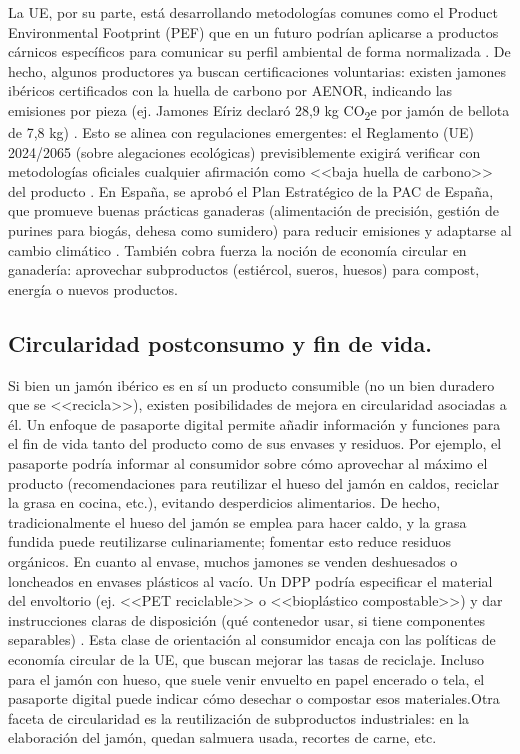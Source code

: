 La UE, por su parte, está desarrollando metodologías comunes como el Product Environmental Footprint (PEF) que en un futuro podrían aplicarse a productos cárnicos específicos para comunicar su perfil ambiental de forma normalizada \cite{noauthor_product_nodate}. De hecho, algunos productores ya buscan certificaciones voluntarias: existen jamones ibéricos certificados con la huella de carbono por AENOR, indicando las emisiones por pieza (ej. Jamones Eíriz declaró 28,9 kg CO\textsubscript{2}e por jamón de bellota de 7,8 kg) \cite{burgues_jamones_2015}. Esto se alinea con regulaciones emergentes: el Reglamento (UE) 2024/2065 (sobre alegaciones ecológicas) previsiblemente exigirá verificar con metodologías oficiales cualquier afirmación como <<baja huella de carbono>> del producto \cite{noauthor_directiva_nodate}. En España, se aprobó el Plan Estratégico de la PAC de España, que promueve buenas prácticas ganaderas (alimentación de precisión, gestión de purines para biogás, dehesa como sumidero) para reducir emisiones y adaptarse al cambio climático \cite{noauthor_plan_nodate}. También cobra fuerza la noción de economía circular en ganadería: aprovechar subproductos (estiércol, sueros, huesos) para compost, energía o nuevos productos.

\subsection{Circularidad postconsumo y fin de vida.}
Si bien un jamón ibérico es en sí un producto consumible (no un bien duradero que se <<recicla>>), existen posibilidades de mejora en circularidad asociadas a él. Un enfoque de pasaporte digital permite añadir información y funciones para el fin de vida tanto del producto como de sus envases y residuos. Por ejemplo, el pasaporte podría informar al consumidor sobre cómo aprovechar al máximo el producto (recomendaciones para reutilizar el hueso del jamón en caldos, reciclar la grasa en cocina, etc.), evitando desperdicios alimentarios. De hecho, tradicionalmente el hueso del jamón se emplea para hacer caldo, y la grasa fundida puede reutilizarse culinariamente; fomentar esto reduce residuos orgánicos. En cuanto al envase, muchos jamones se venden deshuesados o loncheados en envases plásticos al vacío. Un DPP podría especificar el material del envoltorio (ej. <<PET reciclable>> o <<bioplástico compostable>>) y dar instrucciones claras de disposición (qué contenedor usar, si tiene componentes separables) \cite{noauthor_digital_nodate-1}. Esta clase de orientación al consumidor encaja con las políticas de economía circular de la UE, que buscan mejorar las tasas de reciclaje. Incluso para el jamón con hueso, que suele venir envuelto en papel encerado o tela, el pasaporte digital puede indicar cómo desechar o compostar esos materiales.Otra faceta de circularidad es la reutilización de subproductos industriales: en la elaboración del jamón, quedan salmuera usada, recortes de carne, etc.

